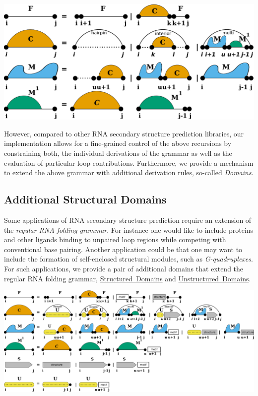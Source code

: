  
\begin{DoxyImageNoCaption}
  \mbox{\includegraphics[width=\textwidth,height=\textheight/2,keepaspectratio=true]{recursions}}
\end{DoxyImageNoCaption}


However, compared to other R\+NA secondary structure prediction libraries, our implementation allows for a fine-\/grained control of the above recursions by constraining both, the individual derivations of the grammar as well as the evaluation of particular loop contributions. Furthermore, we provide a mechanism to extend the above grammar with additional derivation rules, so-\/called {\itshape Domains}.\hypertarget{folding_grammar_sec_domains}{}\subsection{Additional Structural Domains}\label{folding_grammar_sec_domains}
Some applications of R\+NA secondary structure prediction require an extension of the {\itshape regular R\+NA folding grammar}. For instance one would like to include proteins and other ligands binding to unpaired loop regions while competing with conventional base pairing. Another application could be that one may want to include the formation of self-\/enclosed structural modules, such as {\itshape G-\/quadruplexes}. For such applications, we provide a pair of additional domains that extend the regular R\+NA folding grammar, \mbox{\hyperlink{group__domains__struc}{Structured Domains}} and \mbox{\hyperlink{group__domains__up}{Unstructured Domains}}.

 
\begin{DoxyImageNoCaption}
  \mbox{\includegraphics[width=\textwidth,height=\textheight/2,keepaspectratio=true]{GCrecursion}}
\end{DoxyImageNoCaption}


